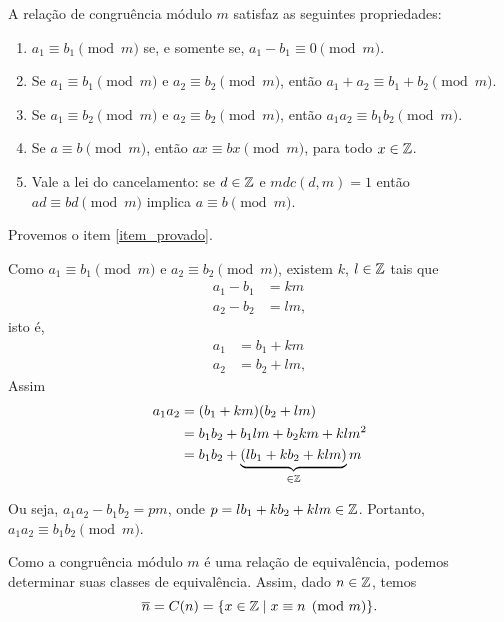 \begin{teorema}
    A rela{\c c}{\~a}o de congru{\^e}ncia m{\'o}dulo $m$ satisfaz as seguintes propriedades:
    \begin{enumerate}[label={\roman*})]
        \item $a_{1}\equiv b_{1}\pmod{m}$ se, e somente se, $a_{1}-b_{1}\equiv 0\pmod{m}$.
        \item Se $a_{1}\equiv b_{1}\pmod{m}$ e $a_{2}\equiv b_{2}\pmod{m}$, ent{\~a}o $a_{1}+a_{2}\equiv b_{1}+b_{2}\pmod{m}$.
        \item Se $a_{1}\equiv b_{2}\pmod{m}$ e $a_{2}\equiv b_{2}\pmod{m}$, ent{\~a}o $a_{1}a_{2}\equiv b_{1}b_{2}\pmod{m}$.\label{item_provado}
        \item Se $a\equiv b\pmod{m}$, ent{\~a}o $ax\equiv bx\pmod{m}$, para todo $x \in \mathbb{Z}$.
        \item Vale a lei do cancelamento: se $d \in \mathbb{Z}$ e $mdc(d,m) = 1$ ent{\~a}o $ad \equiv bd \pmod{m}$ implica $a\equiv b \pmod{m}$.
    \end{enumerate}
\end{teorema}
\begin{prova}
    Provemos o item \ref{item_provado}.

    Como $a_{1}\equiv b_{1}\pmod{m}$ e $a_{2}\equiv b_{2}\pmod{m}$, existem $k$, $l \in \mathbb{Z}$ tais que
    \begin{align*}
        a_1 - b_1 &= km\\
        a_2 - b_2 &= lm,
    \end{align*}
    isto \'e,
    \begin{align*}
        a_1 &= b_1 + km\\
        a_2 &= b_2 + lm,
    \end{align*}
    Assim
    \begin{align*}
        a_1a_2 &= (b_1 + km)(b_2 + lm) \\ &= b_1b_2 + b_1lm + b_2km + klm^2 \\ &= b_1b_2 + \underbrace{(lb_{1}+kb_{2}+klm)}_{\in \mathbb{Z}}m
    \end{align*}

    Ou seja, $a_1a_2 - b_1b_2 = pm$, onde $p = lb_1 + kb_2 + klm \in \mathbb{Z}$. Portanto, $a_1a_2 \equiv b_1b_2 \pmod{m}$.
\end{prova}

Como a congru{\^e}ncia m{\'o}dulo $m$ {\'e} uma rela{\c c}{\~a}o de equival{\^e}ncia, podemos determinar suas classes de equival{\^e}ncia. Assim, dado $n \in \mathbb{Z}$, temos
\[
    \overline{n} = C(n) = \{x \in \mathbb{Z} \mid x\equiv n \pmod{m}\}.
\]

